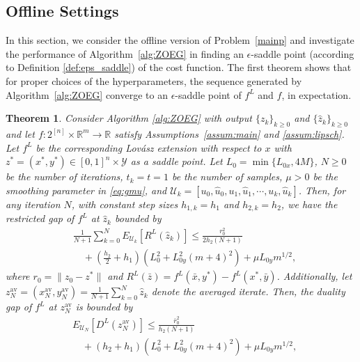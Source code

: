 \documentclass{article}
\theoremstyle{plain}
\newtheorem{theorem}{Theorem}[section]
\theoremstyle{definition}
\theoremstyle{remark}
\begin{document}
\subsection{Offline Settings}
In this section, we consider the offline version of Problem~\eqref{mainp} and investigate the performance of Algorithm~\ref{alg:ZOEG} in finding an %
$\epsilon$-saddle point (according to Definition \ref{def:eps_saddle}) of the cost function. 
The first theorem shows that for proper choices of the hyperparameters, the sequence generated by Algorithm~\ref{alg:ZOEG} %
converge to an $\epsilon$-saddle point of $f^L$ and $f$, in expectation. 
\begin{theorem}\label{th:off}
Consider Algorithm \ref{alg:ZOEG} with output $\{z_k\}_{k\geq0}$ and $\{\hat{z}_k\}_{k\geq0}$ and let $f:2^{[n]}\times\mathbb{R}^m\to\mathbb{R}$ satisfy Assumptions~\ref{assum:main} and \ref{assum:lipsch}. Let $f^L$ be the corresponding Lovász extension with respect to $x$ with $z^\ast =(x^\ast,y^\ast) \in [0,1]^n\times \mathcal{Y}$ as a saddle point. Let 
$L_0 = \min\{L_{0x},4M\}$, 
$N\geq0$ be the number of iterations, $t_k=t=1$ be the number of samples, $\mu>0$ be the  smoothing parameter in \eqref{eq:gmu}, and $\mathcal{U}_k = [u_0,\hat{u}_0 ,u_1,\hat{u}_1,\cdots,u_k,\hat{u}_k]$. 
     Then, for any iteration $N$, with constant step sizes \(h_{1,k}= h_1 \) and \(h_{2,k}= h_2 \),
     we have the restricted gap of $f^L$ at $\hat{z}_k$ bounded by
	\begin{align}
	&\frac{1}{N+1}\sum_{k=0}^N E_{\mathcal{U}_k}[R^L(\hat{z}_k)]\leq \frac{r_0^2}{2h_2(N+1)} \label{eq:eqoff} \\
    &\quad+(\tfrac{h_2}{2}+h_1)(L_0^2+L_{0y}^2(m+4)^2)+\mu L_{0y}m^{1/2}, \nonumber
    \end{align}
    where $r_0=\|z_0-z^\ast\|$ and $R^L(\bar{z}) =f^L(\bar{x},y^\ast)-f^L(x^\ast,\bar{y})$. Additionally,
    let $z^{\mathrm{av}}_N=(x^{\mathrm{av}}_N,y^{\mathrm{av}}_N)=\frac{1}{N+1}\sum_{k=0}^N\hat{z}_k$ denote the averaged iterate. Then,
    the duality gap of $f^L$ at $z^{\mathrm{av}}_N$ is bounded by
    {\begin{align}
	&E_{\mathcal{U}_N}[D^L(z^{\mathrm{av}}_N)]\leq \frac{\bar{r}_0^2}{h_2(N+1)} \label{eq:eqoff1} \\
    &\quad+(h_2+h_1)(L_0^2+L_{0y}^2(m+4)^2)+\mu L_{0y}m^{1/2}, \nonumber

\end{align}}
\end{theorem}
\end{document}

